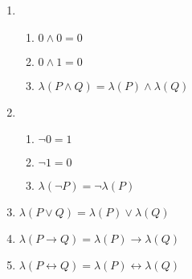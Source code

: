 \documentclass{article}
\begin{document}
\begin{enumerate}
    \item \begin{enumerate}
        \item $0 \land 0 = 0$
        \item $0 \land 1 = 0$
        \item $\lambda(P \land Q) = \lambda(P) \land \lambda(Q)$
    \end{enumerate}
    \item \begin{enumerate}
        \item $\lnot 0 = 1$
        \item $\lnot 1 = 0$
        \item $\lambda(\lnot P) = \lnot \lambda (P)$
    \end{enumerate}
    \item $\lambda (P \lor Q) = \lambda (P) \lor \lambda (Q)$
    \item $\lambda (P \rightarrow Q) = \lambda (P) \rightarrow \lambda (Q)$
    \item $\lambda (P \leftrightarrow Q) = \lambda (P) \leftrightarrow \lambda (Q)$
\end{enumerate}
\end{document}
